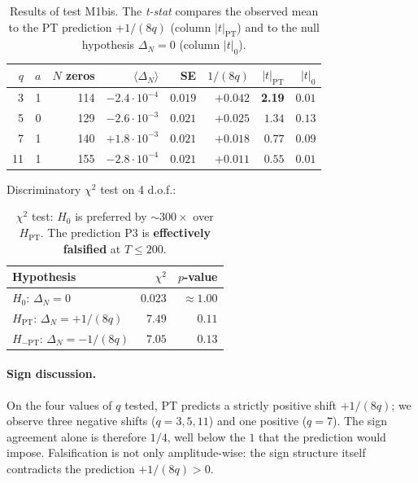 \begin{table}[ht]
\centering
\small
\begin{tabular}{@{}rrrrrrrr@{}}
\toprule
$q$ & $a$ & $N$ zeros & $\langle \Delta_N \rangle$ & SE & $1/(8q)$ & $|t|_{\mathrm{PT}}$ & $|t|_{0}$\\
\midrule
3 & 1 & 114 & $-2.4 \cdot 10^{-4}$ & $0.019$ & $+0.042$ & \textbf{2.19} & $0.01$\\
5 & 0 & 129 & $-2.6 \cdot 10^{-3}$ & $0.021$ & $+0.025$ & $1.34$ & $0.13$\\
7 & 1 & 140 & $+1.8 \cdot 10^{-3}$ & $0.021$ & $+0.018$ & $0.77$ & $0.09$\\
11 & 1 & 155 & $-2.8 \cdot 10^{-4}$ & $0.021$ & $+0.011$ & $0.55$ & $0.01$\\
\bottomrule
\end{tabular}
\caption{Results of test M1bis. The \emph{t-stat} compares the
observed mean to the PT prediction $+1/(8q)$ (column $|t|_{\mathrm{PT}}$)
and to the null hypothesis $\Delta_N = 0$ (column $|t|_{0}$).}
\label{tab:M1bis}
\end{table}

Discriminatory $\chi^{2}$ test on 4 d.o.f.:

\begin{table}[ht]
\centering
\begin{tabular}{@{}lrr@{}}
\toprule
\textbf{Hypothesis} & $\chi^{2}$ & $p$-value\\
\midrule
$H_0$: $\Delta_N = 0$ & $0.023$ & $\approx 1.00$\\
$H_{\mathrm{PT}}$: $\Delta_N = +1/(8q)$ & $7.49$ & $0.11$\\
$H_{-\mathrm{PT}}$: $\Delta_N = -1/(8q)$ & $7.05$ & $0.13$\\
\bottomrule
\end{tabular}
\caption{$\chi^{2}$ test: $H_0$ is preferred by $\sim 300\times$
over $H_{\mathrm{PT}}$. The prediction P3 is \textbf{effectively
falsified} at $T \le 200$.}
\label{tab:chi2_dirichlet}
\end{table}

\paragraph{Sign discussion.}
On the four values of $q$ tested, PT predicts a strictly positive
shift $+1/(8q)$; we observe three negative shifts ($q = 3, 5, 11$)
and one positive ($q = 7$). The sign agreement alone is therefore
$1/4$, well below the $1$ that the prediction would impose.
Falsification is not only amplitude-wise: the sign structure itself
contradicts the prediction $+1/(8q) > 0$.

